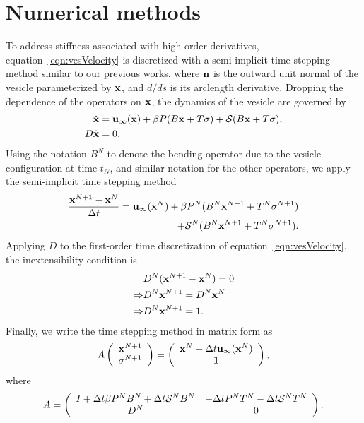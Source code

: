 \documentclass[twoside,twocolumn,9pt]{article}
\begin{document}
\section{Numerical methods}
To address stiffness associated with high-order derivatives,
equation~\eqref{eqn:vesVelocity} is discretized with a semi-implicit
time stepping method similar to our previous works.  
where $\mathbf{n}$ is the outward unit normal of the vesicle
parameterized by $\mathbf{x}$, and $d/ds$ is its arclength derivative.
Dropping the dependence of the operators on $\mathbf{x}$, the dynamics of the
vesicle are governed by
\begin{align}
  \dot{\mathbf{x}} &= \mathbf{u}_{\infty}(\mathbf{x}) + 
  \beta P(B\mathbf{x} + T\sigma) + \mathcal{S}(B\mathbf{x} + T\sigma), \\
  D \dot{\mathbf{x}} &= 0.
\end{align}
Using the notation $B^N$ to denote the bending operator due to the
vesicle configuration at time $t_N$, and similar notation for the other
operators, we apply the semi-implicit time stepping method
\begin{align} 
\begin{split}
  \frac{\mathbf{x}^{N+1} - \mathbf{x}^N}{\Delta t} = \mathbf{u}_\infty(\mathbf{x}^N) 
  + \beta P^N(B^N\mathbf{x}^{N+1} + T^N\sigma^{N+1}) \\
   + \mathcal{S}^N(B^N\mathbf{x}^{N+1} + T^N\sigma^{N+1}).
   \end{split} 
\end{align}
Applying $D$ to the first-order time discretization of
equation~\eqref{eqn:vesVelocity}, the inextensibility condition is
\begin{align*}
  &D^N(\mathbf{x}^{N+1} - \mathbf{x}^N) = 0 \\ 
  \Rightarrow &D^N\mathbf{x}^{N+1} = D^N \mathbf{x}^N \\ 
  \Rightarrow &D^N\mathbf{x}^{N+1} = 1.
\end{align*}
Finally, we write the time stepping method in matrix form as
\begin{align}
  A \left(
    \begin{array}{c}
      \mathbf{x}^{N+1} \\ \sigma^{N+1}
    \end{array}
  \right) = 
  \left(
    \begin{array}{c}
      \mathbf{x}^{N} + \Delta t \mathbf{u}_\infty(\mathbf{x}^N) \\ \mathbf{1}
    \end{array}
  \right),
\end{align}
where
\begin{align}
 A = \left(
  \begin{array}{cc}
    I + \Delta t \beta P^N B^N + \Delta t \mathcal{S}^N B^N & 
    -\Delta t P^N T^N - \Delta t \mathcal{S}^N T^N \\
    D^N & 0
  \end{array}
  \right).
\end{align}
\end{document}
